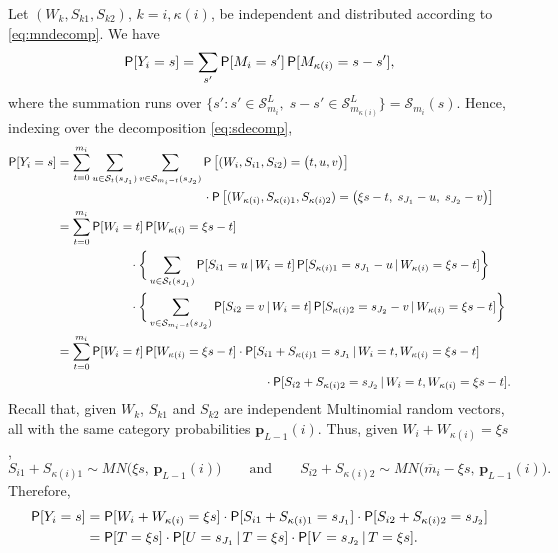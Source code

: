 \documentclass[11pt,draft]{article}
\newcommand{\Ssp}{\mathcal{S}}
\newcommand{\pv}{\mathbf{p}}
\newcommand{\mb}{\overline{m}}
\begin{document}
\begin{pf}
Let $(W_k, S_{k1}, S_{k2})$, $k = i, \kappa(i)$, be independent and
distributed according to \eqref{eq:mndecomp}.
We have
\[ \P[Y_i = s] = \sum_{s'} \P[M_i = s'] \P[M_{\kappa(i)} = s - s'], \]
where the summation runs over
$\big\{ s' : s' \in \Ssp_{m_i}^L,\; s-s' \in \Ssp_{m_{\kappa(i)}}^L \big\}
= \Ssp_{m_i}(s)$.
Hence, indexing over the decomposition \eqref{eq:sdecomp},
\begin{align*}
\P[Y_i = s] &= \sum_{t = 0}^{m_i} \sum_{u \in \Ssp_t(s_{J_1})}
\sum_{v \in \Ssp_{m_i - t}(s_{J_2})}
\P\big[(W_i, S_{i1}, S_{i2}) = \big(t, u, v\big)\big] \\
&\hspace{12em} \cdot
\P\big[(W_{\kappa(i)}, S_{\kappa(i)1}, S_{\kappa(i)2}) =
\big(\xi s - t,\; s_{J_1} - u,\; s_{J_2} - v\big)\big] \\
&= \sum_{t = 0}^{m_i} \P[W_i = t] \P[W_{\kappa(i)} = \xi s - t] \\
&\hspace{6em}\cdot
\bigg\{ \sum_{u \in \Ssp_t(s_{J_1})} \P[S_{i1} = u \given W_i = t]
\P[S_{\kappa(i)1} = s_{J_1} - u \given W_{\kappa(i)} = \xi s - t] \bigg\} \\
&\hspace{6em}\cdot \bigg\{ \sum_{v \in \Ssp_{m_i - t}(s_{J_2})}
\P[S_{i2} = v \given W_i = t]
\P[S_{\kappa(i)2} = s_{J_2} - v \given W_{\kappa(i)} = \xi s - t] \bigg\} \\
&= \sum_{t = 0}^{m_i} \P[W_i = t] \P[W_{\kappa(i)} = \xi s - t]
\cdot \P[S_{i1} + S_{\kappa(i)1} = s_{J_1} \given
W_i = t, W_{\kappa(i)} = \xi s - t] \\
&\hspace{17em}\cdot \P[S_{i2} + S_{\kappa(i)2} = s_{J_2} \given
W_i = t, W_{\kappa(i)} = \xi s - t].
\end{align*}
Recall that, given $W_k$, $S_{k1}$ and $S_{k2}$ are independent
Multinomial random vectors, all with the same category probabilities
$\pv_{L-1}(i)$.
Thus, given $W_i + W_{\kappa(i)} = \xi s$,
\[ S_{i1} + S_{\kappa(i)1} \sim MN\big(\xi s,\, \pv_{L-1}(i)\big)
\qquad\text{and}\qquad
S_{i2} + S_{\kappa(i)2} \sim MN\big(\mb_i - \xi s,\,
\pv_{L-1}(i)\big). \]
Therefore,
\begin{align*}
\P[Y_i = s] &= \P[W_i + W_{\kappa(i)} = \xi s] \cdot
\P[S_{i1} + S_{\kappa(i)1} = s_{J_1}] \cdot
\P[S_{i2} + S_{\kappa(i)2} = s_{J_2}] \\
&= \P[T = \xi s] \cdot \P[U = s_{J_1} \given T = \xi s] \cdot
\P[V = s_{J_2} \given T = \xi s].
\end{align*}
\end{pf}
\end{document}
